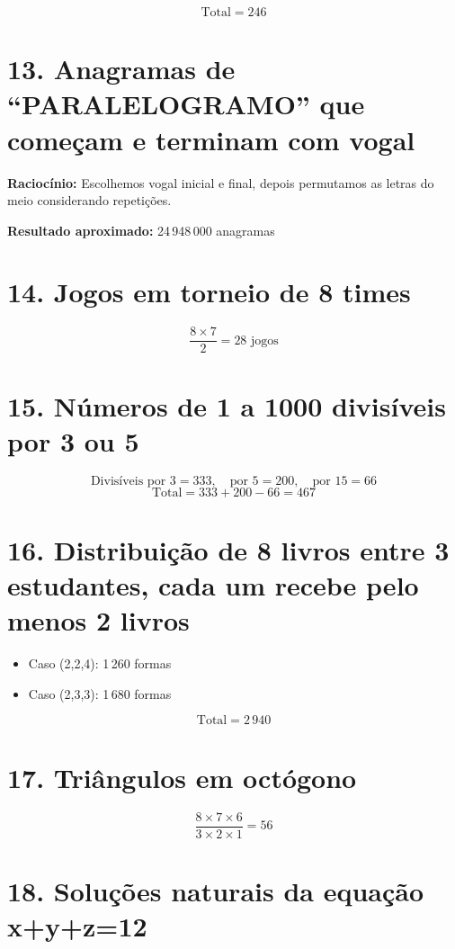 \documentclass[12pt,a4paper]{article}
\begin{document}
\[
\text{Total} = 246
\]

\section*{13. Anagramas de ``PARALELOGRAMO'' que começam e terminam com vogal}

\textbf{Raciocínio:}  
Escolhemos vogal inicial e final, depois permutamos as letras do meio considerando repetições.  

\textbf{Resultado aproximado:} 24\,948\,000 anagramas

\section*{14. Jogos em torneio de 8 times}

\[
\frac{8 \times 7}{2} = 28 \text{ jogos}
\]

\section*{15. Números de 1 a 1000 divisíveis por 3 ou 5}

\[
\text{Divisíveis por 3} = 333, \quad \text{por 5} = 200, \quad \text{por 15} = 66
\]  
\[
\text{Total} = 333 + 200 - 66 = 467
\]

\section*{16. Distribuição de 8 livros entre 3 estudantes, cada um recebe pelo menos 2 livros}

\begin{itemize}
    \item Caso (2,2,4): 1\,260 formas  
    \item Caso (2,3,3): 1\,680 formas
\end{itemize}

\[
\text{Total} = 2\,940
\]

\section*{17. Triângulos em octógono}

\[
\frac{8 \times 7 \times 6}{3 \times 2 \times 1} = 56
\]

\section*{18. Soluções naturais da equação x+y+z=12}
\end{document}
